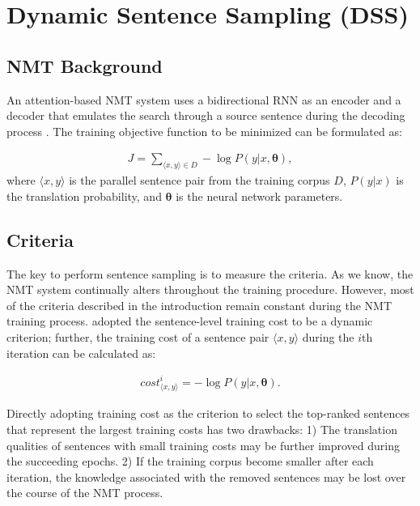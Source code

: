 \documentclass[11pt,a4paper]{article}
\begin{document}
\section{Dynamic Sentence Sampling (DSS)}
\label{sec:edss}
\subsection{NMT Background}
\label{sec:back}
An attention-based NMT system uses a bidirectional RNN as an encoder and a decoder that emulates the search through a source sentence during the decoding process
\citep{DBLP:journals/corr/BahdanauCB14,luong-pham-manning:2015:EMNLP}. The training objective function to be minimized can be formulated as:


	\begin{equation}
		\label{eq:oj}
		\begin{aligned}
			J = \sum_{\langle x, y\rangle \in D} - \log P(y|x, \bm{\theta}),
		\end{aligned}
	\end{equation}
%
where $\langle x, y\rangle$ is the parallel sentence pair from the training corpus $D$,  $P(y|x)$ is the translation probability, and $\bm{\theta}$ is the neural network parameters. 


\subsection{Criteria}
\label{sec:cr}
The key to perform sentence sampling is to measure the criteria. As we know, the NMT system continually alters throughout the training procedure. However, most of the criteria described in the introduction remain constant during the NMT training process. \citet{zhang-EtAl:2017:I17-2} adopted the  sentence-level training cost to be a dynamic criterion; further, the training cost of a sentence pair $\langle x, y\rangle$ during the $i$th iteration can be calculated as:


	\begin{equation}
		\label{eq:cost}
		\begin{aligned}
			cost_{{\langle x, y\rangle}}^i= -\log P(y|x, \bm{\theta}).
		\end{aligned}
	\end{equation}


Directly adopting training cost as the criterion to select the top-ranked sentences that represent the largest training costs has two drawbacks: 1) The translation qualities of sentences with small training costs may be further improved during the succeeding epochs. 2) If the training corpus become smaller after each iteration, the knowledge associated with the removed sentences may be lost over the course of the NMT process. 
\end{document}
